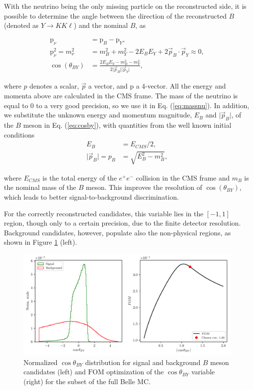 With the neutrino being the only missing particle on the reconstructed side, it is possible to determine the angle between the direction of the reconstructed $B$ (denoted as $Y \to K K \ell$) and the nominal $B$, as

\begin{align}
\mathrm{p}_\nu &= \mathrm{p}_B - \mathrm{p}_{Y}, \\
\label{eq:massnu}
\mathrm{p}_\nu^2 = m_\nu^2 &= m_B^2 + m_Y^2 - 2E_BE_Y + 2\vec{p}_B \cdot \vec{p}_Y \approx 0, \\ 
\label{eq:cosby}
\cos \left(\theta_{BY}\right) &= \frac{2E_BE_Y - m_B^2 - m_Y^2}{2\vert \vec{p}_B \vert \vert \vec{p}_Y\vert},
\end{align} 

where $p$ denotes a scalar, $\vec{p}$ a vector, and $\mathrm{p}$ a 4-vector. All the energy and momenta above are calculated in the CMS frame. The mass of the neutrino is equal to 0 to a very good precision, so we use it in Eq. (\ref{eq:massnu}). In addition, we substitute the unknown energy and momentum magnitude, $E_B$ and $\vert \vec{p}_B \vert$, of the $B$ meson in Eq. (\ref{eq:cosby}), with quantities from the well known initial conditions
\begin{align}
E_B &= E_{CMS} / 2,\\
\vert \vec{p}_B \vert = p_B &= \sqrt{E_B^2 - m_B^2},
\end{align} 

where $E_{CMS}$ is the total energy of the $e^+e^-$ collision in the CMS frame and $m_B$ is the nominal mass of the $B$ meson. This improves the resolution of $\cos \left(\theta_{BY}\right)$, which leads to better signal-to-background discrimination.

For the correctly reconstructed candidates, this variable lies in the $[-1,1]$ region, though only to a certain precision, due to the finite detector resolution. Background candidates, however, populate also the non-physical regions, as shown in Figure \ref{fig:cosby} (left). 

\begin{figure}[H]
	\centering
	\captionsetup{width=.8\linewidth}
	\includegraphics[width=\linewidth]{fig/cosBY}
	\caption{Normalized $\cos \theta_{BY}$ distribution for signal and background $B$ meson candidates (left) and $\mathrm{FOM}$ optimization of the $\cos \theta_{BY}$ variable (right) for the subset of the full Belle MC.}
	\label{fig:cosby}
\end{figure}

